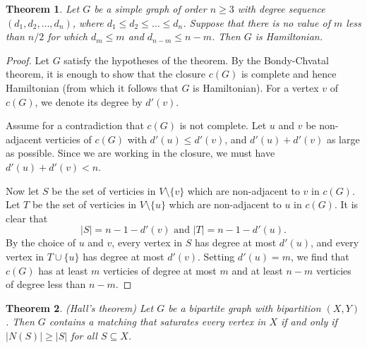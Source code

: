 \documentclass[12pt]{amsart}
\newtheorem{thm}{Theorem}
\theoremstyle{definition}
\begin{document}
\begin{thm}
Let $G$ be a simple graph of order $n \geq 3$ with degree sequence $(d_1,d_2,\ldots,d_n)$, where
$d_1 \leq d_2 \leq \ldots \leq d_n$. Suppose that there is no value of $m$ less than $n/2$ for which
$d_m \leq m$ and $d_{n-m} \leq n-m$. Then $G$ is Hamiltonian.
\end{thm}

\begin{proof}
Let $G$ satisfy the hypotheses of the theorem. By the Bondy-Chvatal theorem, it is enough to show that
the closure $c(G)$ is complete and hence Hamiltonian (from which it follows that $G$ is Hamiltonian).
For a vertex $v$ of $c(G)$, we denote its degree by $d'(v)$.

Assume for a contradiction that $c(G)$ is not complete. Let $u$ and $v$ be non-adjacent verticies of
$c(G)$ with $d'(u) \leq d'(v)$, and $d'(u) + d'(v)$ as large as possible. Since we are working in the
closure, we must have $d'(u) + d'(v) < n$.

Now let $S$ be the set of verticies in $V \setminus \{v\}$ which are non-adjacent to $v$ in $c(G)$.
Let $T$ be the set of verticies in $V \setminus \{u\}$ which are non-adjacent to $u$ in $c(G)$. It is
clear that $$|S| = n - 1 - d'(v) \text{ and } |T| = n - 1 - d'(u).$$ By the choice of $u$ and $v$,
every vertex in $S$ has degree at most $d'(u)$, and every vertex in $T \cup \{u\}$ has degree
at most $d'(v)$. Setting $d'(u) = m$, we find that $c(G)$ has at least $m$ verticies of
degree at most $m$ and at least $n-m$ verticies of degree less than $n-m$. 
\end{proof}

\begin{thm} (Hall's theorem)
Let $G$ be a bipartite graph with bipartition $(X,Y)$. Then $G$ contains a matching that saturates
every vertex in $X$ if and only if $|N(S)| \geq |S|$ for all $S \subseteq X$.
\end{thm}
\end{document}
